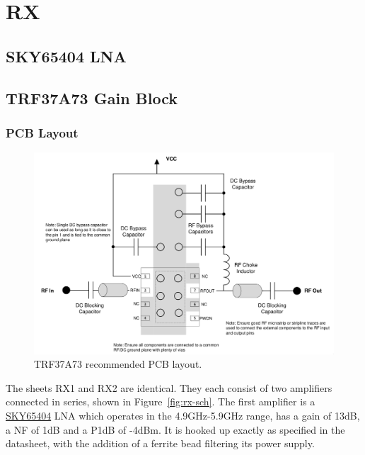 \section{RX}
\label{sec:rx}

\subsection{SKY65404 LNA}
\label{sec:sky65404}



\subsection{TRF37A73 Gain Block}
\label{sec:trf37a73}



\subsubsection{PCB Layout}
\label{sec:trf37a73-pcb}


\begin{figure}[h]
        \centering
        \includegraphics[width=\textwidth]{data/trf37a73-pcb}
        \caption{TRF37A73 recommended PCB layout.}
        \label{fig:trf37a73-pcb}
\end{figure}




The sheets RX1 and RX2 are identical. They each consist of two amplifiers connected in series, shown
in Figure~\ref{fig:rx-sch}. The first amplifier is a
\href{http://www.skyworksinc.com/uploads/documents/SKY65404_31_201512J.pdf}{SKY65404} LNA which
operates in the 4.9GHz-5.9GHz range, has a gain of 13dB, a NF of 1dB and a P1dB of -4dBm. It is
hooked up exactly as specified in the datasheet, with the addition of a ferrite bead filtering its
power supply.

